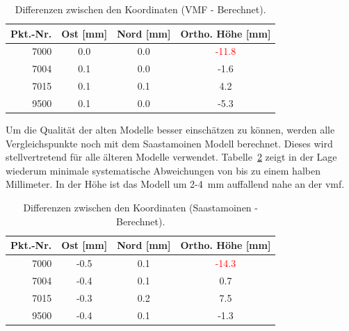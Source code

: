 \begin{table}[htbp]
    \centering
    \caption{Differenzen zwischen den Koordinaten (VMF - Berechnet).}
    \label{tab:vmf-ber}
    \begin{tabular}{rccc}
        \toprule
        \textbf{Pkt.-Nr.} & \textbf{Ost [mm]} & \textbf{Nord [mm]} & \textbf{Ortho. Höhe [mm]} \\
        \midrule
        7000 &  0.0 &  0.0 &  \textcolor{red}{-11.8} \\
        \rowcolor{lightgray}
        7004 &  0.1 &  0.0 & -1.6 \\
        7015 &  0.1 &  0.1 &  4.2 \\
        \rowcolor{lightgray}
        9500 &  0.1 &  0.0 & -5.3 \\
        \bottomrule
    \end{tabular}
\end{table}

Um die Qualität der alten Modelle besser einschätzen zu können, werden alle Vergleichspunkte noch mit dem Saastamoinen Modell berechnet.
Dieses wird stellvertretend für alle älteren Modelle verwendet. Tabelle~\ref{tab:saas-ber} zeigt in der Lage wiederum minimale systematische
Abweichungen von bis zu einem halben Millimeter. In der Höhe ist das Modell um 2-4~mm auffallend nahe an der \gls{vmf}.

\begin{table}[htbp]
    \centering
    \caption{Differenzen zwischen den Koordinaten (Saastamoinen - Berechnet).}
    \label{tab:saas-ber}
    \begin{tabular}{rccc}
        \toprule
        \textbf{Pkt.-Nr.} & \textbf{Ost [mm]} & \textbf{Nord [mm]} & \textbf{Ortho. Höhe [mm]} \\
        \midrule
        7000 & -0.5 &  0.1 &  \textcolor{red}{-14.3} \\
        \rowcolor{lightgray}
        7004 & -0.4 &  0.1 &  0.7 \\
        7015 & -0.3 &  0.2 &  7.5 \\
        \rowcolor{lightgray}
        9500 & -0.4 &  0.1 & -1.3 \\
        \bottomrule
    \end{tabular}
\end{table}

